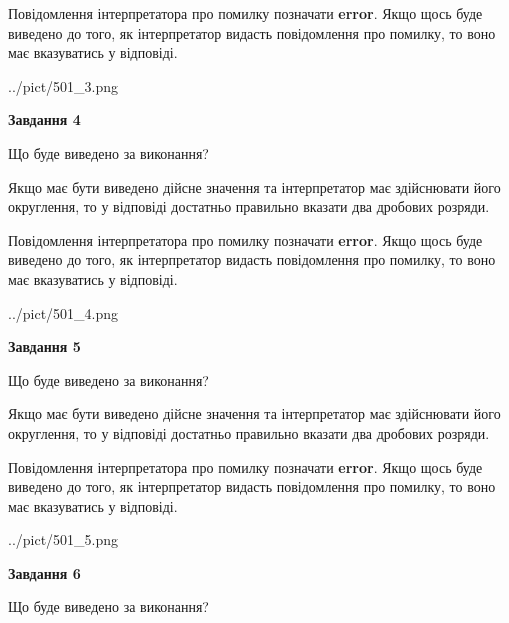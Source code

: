 \documentclass[12pt, ukrainian]{article}
\begin{document}
{\begin {Large}
Повідомлення інтерпретатора про помилку позначати \textbf{error}.
Якщо щось буде виведено до того, як інтерпретатор видасть повідомлення про помилку, 
то воно має вказуватись у відповіді. \par

\begin{center}
	{../pict/501_3.png}
\end{center}
\newpage

{\begin {center}\textbf{Завдання 4}\end {center}}\par
Що буде виведено за виконання? \par

Якщо має бути виведено дійсне значення та інтерпретатор має здійснювати його округлення, 
то у відповіді достатньо правильно вказати два дробових розряди.

Повідомлення інтерпретатора про помилку позначати \textbf{error}.
Якщо щось буде виведено до того, як інтерпретатор видасть повідомлення про помилку, 
то воно має вказуватись у відповіді. \par

\begin{center}
	{../pict/501_4.png}
\end{center}
\newpage

{\begin {center}\textbf{Завдання 5}\end {center}}\par
Що буде виведено за виконання? \par

Якщо має бути виведено дійсне значення та інтерпретатор має здійснювати його округлення, 
то у відповіді достатньо правильно вказати два дробових розряди.

Повідомлення інтерпретатора про помилку позначати \textbf{error}.
Якщо щось буде виведено до того, як інтерпретатор видасть повідомлення про помилку, 
то воно має вказуватись у відповіді. \par

\begin{center}
	{../pict/501_5.png}
\end{center}
\newpage

{\begin {center}\textbf{Завдання 6}\end {center}}\par
Що буде виведено за виконання? \par


\end{Large}}
\end{document}
